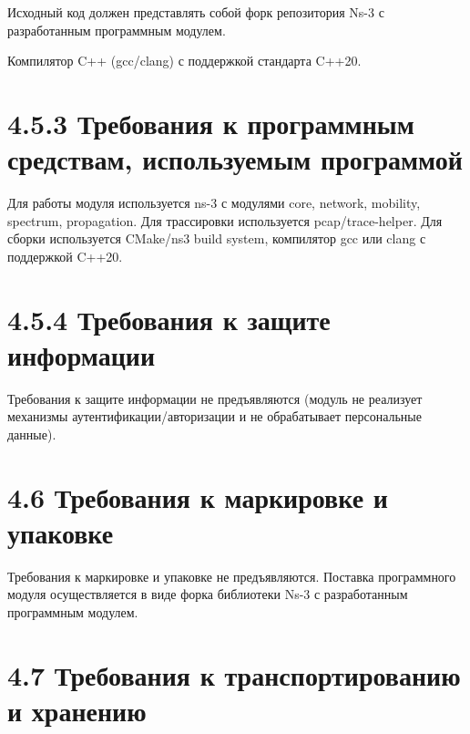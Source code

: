 Исходный код должен представлять собой форк репозитория Ns-3 с
разработанным программным модулем.

Компилятор C++ (gcc/clang) с поддержкой стандарта C++20.

\section{4.5.3 Требования к программным средствам, используемым
программой}\label{ux442ux440ux435ux431ux43eux432ux430ux43dux438ux44f-ux43a-ux43fux440ux43eux433ux440ux430ux43cux43cux43dux44bux43c-ux441ux440ux435ux434ux441ux442ux432ux430ux43c-ux438ux441ux43fux43eux43bux44cux437ux443ux435ux43cux44bux43c-ux43fux440ux43eux433ux440ux430ux43cux43cux43eux439}

Для работы модуля используется ns-3 с модулями core, network, mobility,
spectrum, propagation. Для трассировки используется pcap/trace-helper.
Для сборки используется CMake/ns3 build system, компилятор gcc или clang
с поддержкой C++20.

\section{4.5.4 Требования к защите
информации}\label{ux442ux440ux435ux431ux43eux432ux430ux43dux438ux44f-ux43a-ux437ux430ux449ux438ux442ux435-ux438ux43dux444ux43eux440ux43cux430ux446ux438ux438}

Требования к защите информации не предъявляются (модуль не реализует
механизмы аутентификации/авторизации и не обрабатывает персональные
данные).

\section{4.6 Требования к маркировке и
упаковке}\label{ux442ux440ux435ux431ux43eux432ux430ux43dux438ux44f-ux43a-ux43cux430ux440ux43aux438ux440ux43eux432ux43aux435-ux438-ux443ux43fux430ux43aux43eux432ux43aux435}

Требования к маркировке и упаковке не предъявляются. Поставка
программного модуля осуществляется в виде форка библиотеки Ns-3 с
разработанным программным модулем.

\section{4.7 Требования к транспортированию и
хранению}\label{ux442ux440ux435ux431ux43eux432ux430ux43dux438ux44f-ux43a-ux442ux440ux430ux43dux441ux43fux43eux440ux442ux438ux440ux43eux432ux430ux43dux438ux44e-ux438-ux445ux440ux430ux43dux435ux43dux438ux44e}

